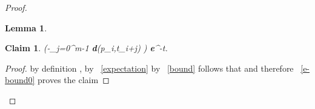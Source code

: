 \documentclass[11pt]{article}
\newtheorem{lem}[thm]{Lemma}
\newtheorem{claim}{Claim}[section]
\newcommand{\be}{}
\newcommand{\envert}[1]{\left\lvert#1\right\rvert}
\let\abs=\envert
\newcommand{\bfe}{\textbf{e}}
\newcommand{\dist}{\textbf{d}}
\begin{document}
\begin{proof}
\begin{lem}
\end{lem}
\begin{claim}
\be \Pr(\abs{-\sum_{j=0}^{m-1} \dist(p_i,t_{i+j})} \geq
\varepsilon {}) \leq \bfe^{-t}. \ee
\end{claim}
\begin{proof}
 by definition , by ~\ref{expectation}  by ~\ref{bound} follows that  and therefore ~\ref{e-bound0} proves the claim
\end{proof}

\end{proof} 
\end{document}
